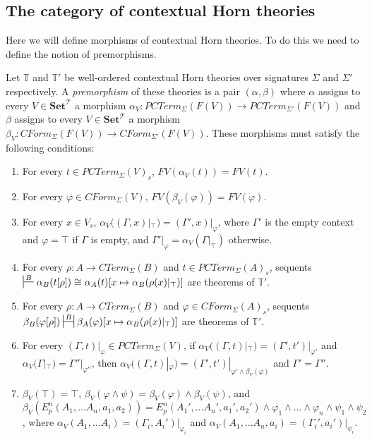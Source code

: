 \documentclass[reqno]{amsart}
\theoremstyle{definition}
\theoremstyle{remark}
\newcommand{\cat}[1]{\mathbf{#1}}
\newcommand{\Set}{\cat{Set}}
\numberwithin{figure}{section}
\begin{document}
\subsection{The category of contextual Horn theories}

Here we will define morphisms of contextual Horn theories.
To do this we need to define the notion of premorphisms.

\begin{defn}
Let $\mathbb{T}$ and $\mathbb{T}'$ be well-ordered contextual Horn theories over signatures $\Sigma$ and $\Sigma'$ respectively.
A \emph{premorphism} of these theories is a pair $(\alpha,\beta)$ where $\alpha$ assigns to every $V \in \Set^\mathcal{T}$
a morphism $\alpha_V : PCTerm_\Sigma(F(V)) \to PCTerm_{\Sigma'}(F(V))$
and $\beta$ assigns to every $V \in \Set^\mathcal{T}$ a morphism $\beta_V : CForm_\Sigma(F(V)) \to CForm_{\Sigma'}(F(V))$.
These morphisms must satisfy the following conditions:
\begin{enumerate}
\item \label{con-mor-sig-a-fv}
For every $t \in PCTerm_\Sigma(V)_s$, $FV(\alpha_V(t)) = FV(t)$.
\item \label{con-mor-sig-b-fv}
For every $\varphi \in CForm_\Sigma(V)$, $FV(\beta_V(\varphi)) = FV(\varphi)$.
\item \label{con-mor-sig-a-var}
For every $x \in V_s$, $\alpha_V((\Gamma,x)|_\top) = (\Gamma',x)|_\varphi$,
    where $\Gamma'$ is the empty context and $\varphi = \top$ if $\Gamma$ is empty, and $\Gamma'|_\varphi = \alpha_V(\Gamma|_\top)$ otherwise.
\item \label{con-mor-sig-a-subst}
For every $\rho : A \to CTerm_\Sigma(B)$ and $t \in PCTerm_\Sigma(A)_s$,
    sequents $\sststile{}{B} \alpha_B(t[\rho]) \cong \alpha_A(t)[x \mapsto \alpha_B(\rho(x)|_\top)]$ are theorems of $\mathbb{T}'$.
\item \label{con-mor-sig-b-subst}
For every $\rho : A \to CTerm_\Sigma(B)$ and $\varphi \in CForm_\Sigma(A)_s$,
    sequents $\beta_B(\varphi[\rho]) \allowbreak \ssststile{}{B} \beta_A(\varphi)[x \mapsto \alpha_B(\rho(x)|_\top)]$ are theorems of $\mathbb{T}'$.
\item \label{con-mor-sig-a-op}
For every $(\Gamma,t)|_\varphi \in PCTerm_\Sigma(V)$, if $\alpha_V((\Gamma,t)|_\top) = (\Gamma',t')|_{\varphi'}$ and $\alpha_V(\Gamma|_\top) \allowbreak = \Gamma''|_{\varphi''}$,
    then $\alpha_V((\Gamma,t)|_\varphi) = (\Gamma',t')|_{\varphi' \land \beta_V(\varphi)}$ and $\Gamma' = \Gamma''$.
\item \label{con-mor-sig-b-op}
$\beta_V(\top) = \top$, $\beta_V(\varphi \land \psi) = \beta_V(\varphi) \land \beta_V(\psi)$,
    and $\beta_V(E^n_p(A_1, \ldots A_n, a_1, a_2)) = E^n_p(A_1', \ldots A_n', a_1', a_2') \land \varphi_1 \land \ldots \land \varphi_n \land \psi_1 \land \psi_2$,
    where $\alpha_V(A_1, \ldots A_i) = (\Gamma_i, A_i')|_{\varphi_i}$ and $\alpha_V(A_1, \ldots A_n, \allowbreak a_i) = (\Gamma_i', a_i')|_{\psi_i}$.
\end{enumerate}
\end{defn}
\end{document}
